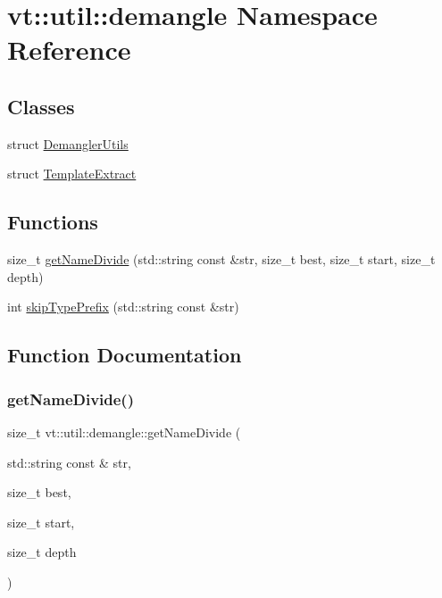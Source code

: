 \hypertarget{namespacevt_1_1util_1_1demangle}{}\section{vt\+:\+:util\+:\+:demangle Namespace Reference}
\label{namespacevt_1_1util_1_1demangle}
\subsection*{Classes}
\begin{DoxyCompactItemize}
\item 
struct \hyperlink{structvt_1_1util_1_1demangle_1_1_demangler_utils}{Demangler\+Utils}
\item 
struct \hyperlink{structvt_1_1util_1_1demangle_1_1_template_extract}{Template\+Extract}
\end{DoxyCompactItemize}
\subsection*{Functions}
\begin{DoxyCompactItemize}
\item 
size\+\_\+t \hyperlink{namespacevt_1_1util_1_1demangle_a7ab5035f9fcd5ff991444088ef4d2329}{get\+Name\+Divide} (std\+::string const \&str, size\+\_\+t best, size\+\_\+t start, size\+\_\+t depth)
\item 
int \hyperlink{namespacevt_1_1util_1_1demangle_a3340b0b8740ca544dd263ad3cde28e76}{skip\+Type\+Prefix} (std\+::string const \&str)
\end{DoxyCompactItemize}


\subsection{Function Documentation}
\mbox{\label{namespacevt_1_1util_1_1demangle_a7ab5035f9fcd5ff991444088ef4d2329}} 
\subsubsection{\texorpdfstring{get\+Name\+Divide()}{getNameDivide()}}
{\footnotesize\ttfamily size\+\_\+t vt\+::util\+::demangle\+::get\+Name\+Divide (\begin{DoxyParamCaption}\item[{std\+::string const \&}]{str,  }\item[{size\+\_\+t}]{best,  }\item[{size\+\_\+t}]{start,  }\item[{size\+\_\+t}]{depth }\end{DoxyParamCaption})}

